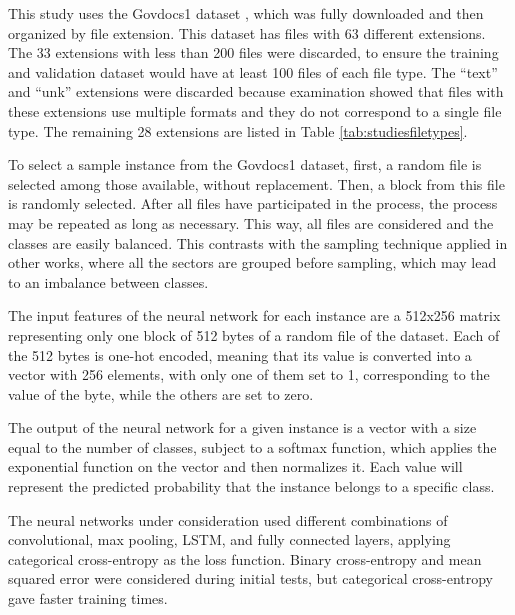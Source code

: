 
This study uses the Govdocs1 dataset \cite{garfinkel_bringing_2009}, which was fully downloaded and then organized by file extension.
This dataset has files with 63 different extensions. The 33 extensions with less than 200 files were discarded, to ensure the training and validation dataset would have at least 100 files of each file type.
The  ``text'' and ``unk'' extensions were discarded because examination showed that files with these extensions use multiple formats and they do not correspond to a single file type.
The remaining 28 extensions are listed in Table \ref{tab:studiesfiletypes}.

To select a sample instance from the Govdocs1 dataset, first, a random file is selected among those available, without replacement. Then, a block from this file is randomly selected. After all files have participated in the process, the process may be repeated as long as necessary. This way, all files are considered and the classes are easily balanced.
This contrasts with the sampling technique applied in other works, where all the sectors are grouped before sampling, which may lead to an imbalance between classes.

The input features of the neural network for each instance are a 512x256 matrix representing only one block of 512 bytes of a random file of the dataset. Each of the 512 bytes is one-hot encoded, meaning that its value is converted into a vector with 256 elements, with only one of them set to 1, corresponding to the value of the byte, while the others are set to zero.

The output of the neural network for a given instance is a vector with a size equal to the number of classes, subject to a softmax function, which applies the exponential function on the vector and then normalizes it. Each value will represent the predicted probability that the instance belongs to a specific class.

The neural networks under consideration used different combinations of convolutional, max pooling, LSTM, and fully connected layers, applying categorical cross-entropy as the loss function. Binary cross-entropy and mean squared error were considered during initial tests, but categorical cross-entropy gave faster training times.

